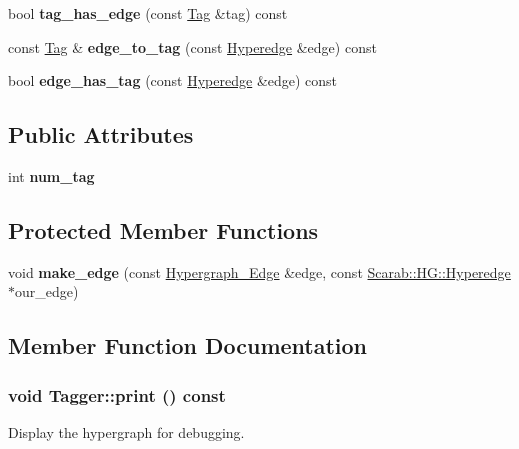 \begin{DoxyCompactItemize}
\item 
\hypertarget{classTagger_ae270a5be64b93945c180996aedcf6372}{
bool {\bfseries tag\_\-has\_\-edge} (const \hyperlink{structTag}{Tag} \&tag) const }
\label{classTagger_ae270a5be64b93945c180996aedcf6372}

\item 
\hypertarget{classTagger_ad615c8356f380baab01ae6675a25c409}{
const \hyperlink{structTag}{Tag} \& {\bfseries edge\_\-to\_\-tag} (const \hyperlink{classScarab_1_1HG_1_1Hyperedge}{Hyperedge} \&edge) const }
\label{classTagger_ad615c8356f380baab01ae6675a25c409}

\item 
\hypertarget{classTagger_ad7f1dda6082e71cd113a3d77e9c33275}{
bool {\bfseries edge\_\-has\_\-tag} (const \hyperlink{classScarab_1_1HG_1_1Hyperedge}{Hyperedge} \&edge) const }
\label{classTagger_ad7f1dda6082e71cd113a3d77e9c33275}

\end{DoxyCompactItemize}
\subsection*{Public Attributes}
\begin{DoxyCompactItemize}
\item 
\hypertarget{classTagger_a4bf3332c608c078cbb2d5692c4f13b43}{
int {\bfseries num\_\-tag}}
\label{classTagger_a4bf3332c608c078cbb2d5692c4f13b43}

\end{DoxyCompactItemize}
\subsection*{Protected Member Functions}
\begin{DoxyCompactItemize}
\item 
\hypertarget{classTagger_a305fd4cf75f2149a57109772e195eb47}{
void {\bfseries make\_\-edge} (const \hyperlink{classHypergraph__Edge}{Hypergraph\_\-Edge} \&edge, const \hyperlink{classScarab_1_1HG_1_1Hyperedge}{Scarab::HG::Hyperedge} $\ast$our\_\-edge)}
\label{classTagger_a305fd4cf75f2149a57109772e195eb47}

\end{DoxyCompactItemize}


\subsection{Member Function Documentation}
\hypertarget{classTagger_a4ebe0aebd7c0392970b401a5a6c6cd72}{
\subsubsection[{print}]{\setlength{\rightskip}{0pt plus 5cm}void Tagger::print () const}}
\label{classTagger_a4ebe0aebd7c0392970b401a5a6c6cd72}
Display the hypergraph for debugging. 

